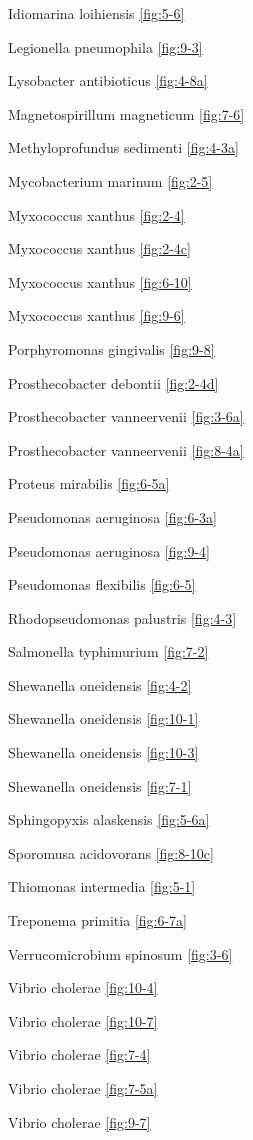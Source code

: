 \documentclass[]{tufte-book}
\begin{document}
Idiomarina loihiensis \ref{fig:5-6}

Legionella pneumophila \ref{fig:9-3}

Lysobacter antibioticus \ref{fig:4-8a}

Magnetospirillum magneticum \ref{fig:7-6}

Methyloprofundus sedimenti \ref{fig:4-3a}

Mycobacterium marinum \ref{fig:2-5}

Myxococcus xanthus \ref{fig:2-4}

Myxococcus xanthus \ref{fig:2-4c}

Myxococcus xanthus \ref{fig:6-10}

Myxococcus xanthus \ref{fig:9-6}

Porphyromonas gingivalis \ref{fig:9-8}

Prosthecobacter debontii \ref{fig:2-4d}

Prosthecobacter vanneervenii \ref{fig:3-6a}

Prosthecobacter vanneervenii \ref{fig:8-4a}

Proteus mirabilis \ref{fig:6-5a}

Pseudomonas aeruginosa \ref{fig:6-3a}

Pseudomonas aeruginosa \ref{fig:9-4}

Pseudomonas flexibilis \ref{fig:6-5}

Rhodopseudomonas palustris \ref{fig:4-3}

Salmonella typhimurium \ref{fig:7-2}

Shewanella oneidensis \ref{fig:4-2}

Shewanella oneidensis \ref{fig:10-1}

Shewanella oneidensis \ref{fig:10-3}

Shewanella oneidensis \ref{fig:7-1}

Sphingopyxis alaskensis \ref{fig:5-6a}

Sporomusa acidovorans \ref{fig:8-10c}

Thiomonas intermedia \ref{fig:5-1}

Treponema primitia \ref{fig:6-7a}

Verrucomicrobium spinosum \ref{fig:3-6}

Vibrio cholerae \ref{fig:10-4}

Vibrio cholerae \ref{fig:10-7}

Vibrio cholerae \ref{fig:7-4}

Vibrio cholerae \ref{fig:7-5a}

Vibrio cholerae \ref{fig:9-7}
\end{document}
